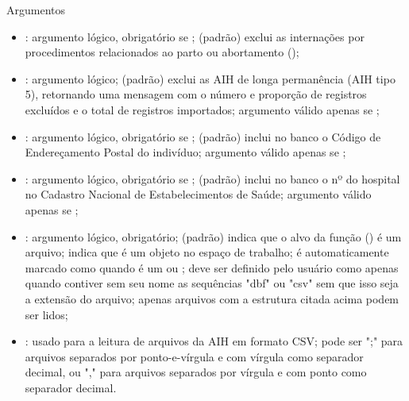 \documentclass[letterpaper]{book}
\begin{document}
\begin{Section}{Argumentos}
\begin{itemize}
\item {}:  argumento lógico, obrigatório se ;  (padrão) exclui as internações por procedimentos relacionados ao parto ou abortamento (); 
\item {}: argumento lógico;  (padrão) exclui as AIH de longa permanência (AIH tipo 5), retornando uma mensagem com o número e proporção de registros excluídos e o total de registros importados; argumento válido apenas se ; 
\item {}:  argumento lógico, obrigatório se ;  (padrão) inclui no banco o Código de Endereçamento Postal do indivíduo; argumento válido apenas se ; 
\item {}:  argumento lógico, obrigatório se ;  (padrão) inclui no banco o nº do hospital no Cadastro Nacional de Estabelecimentos de Saúde; argumento válido apenas se ; 
\item {}:  argumento lógico, obrigatório;  (padrão) indica que o alvo da função () é um arquivo;  indica que  é um objeto no espaço de trabalho; é automaticamente marcado como  quando  é um  ou ; deve ser definido pelo usuário como  apenas quando  contiver sem seu nome as sequências "dbf" ou "csv" sem que isso seja a extensão do arquivo; apenas arquivos com a estrutura citada acima podem ser lidos; 
\item {}:  usado para a leitura de arquivos da AIH em formato CSV; pode ser ";" para arquivos separados por ponto-e-vírgula e com vírgula como separador decimal, ou "," para arquivos separados por vírgula e com ponto como separador decimal. 

\end{itemize}

\end{Section}
%
\end{document}

